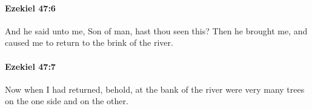 		\paragraph{Ezekiel 47:6} %
			\label{EZEKIEL-47-6}

			And he said unto me, Son of man, hast thou seen this? Then he brought me, and caused me to return to the brink of the river.


		\paragraph{Ezekiel 47:7} %
			\label{EZEKIEL-47-7}

			Now when I had returned, behold, at the bank of the river were very many trees on the one side and on the other.


